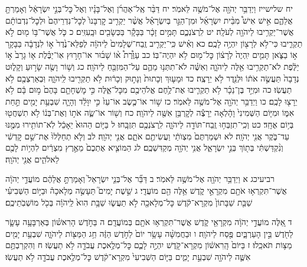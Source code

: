 \documentclass[twoside, openany, parskip=half, 11pt]{book}
\begin{document}
יח שלישייז וַיְדַבֵּ֥ר יְהֹוָ֖ה אֶל־מֹשֶׁ֥ה לֵּאמֹֽר׃ יח דַּבֵּ֨ר אֶֽל־אַהֲרֹ֜ן וְאֶל־בָּנָ֗יו וְאֶל֙ כׇּל־בְּנֵ֣י יִשְׂרָאֵ֔ל וְאָמַרְתָּ֖ אֲלֵהֶ֑ם אִ֣ישׁ אִישׁ֩ מִבֵּ֨ית יִשְׂרָאֵ֜ל וּמִן־הַגֵּ֣ר בְּיִשְׂרָאֵ֗ל אֲשֶׁ֨ר יַקְרִ֤יב קׇרְבָּנוֹ֙ לְכׇל־נִדְרֵיהֶם֙ וּלְכׇל־נִדְבוֹתָ֔ם אֲשֶׁר־יַקְרִ֥יבוּ לַיהֹוָ֖ה לְעֹלָֽה׃ יט לִֽרְצֹנְכֶ֑ם תָּמִ֣ים זָכָ֔ר בַּבָּקָ֕ר בַּכְּשָׂבִ֖ים וּבָֽעִזִּֽים׃ כ כֹּ֛ל אֲשֶׁר־בּ֥וֹ מ֖וּם לֹ֣א תַקְרִ֑יבוּ כִּי־לֹ֥א לְרָצ֖וֹן יִהְיֶ֥ה לָכֶֽם׃ כא וְאִ֗ישׁ כִּֽי־יַקְרִ֤יב זֶֽבַח־שְׁלָמִים֙ לַיהֹוָ֔ה לְפַלֵּא־נֶ֙דֶר֙ א֣וֹ לִנְדָבָ֔ה בַּבָּקָ֖ר א֣וֹ בַצֹּ֑אן תָּמִ֤ים יִֽהְיֶה֙ לְרָצ֔וֹן כׇּל־מ֖וּם לֹ֥א יִהְיֶה־בּֽוֹ׃ כב עַוֶּ֩רֶת֩ א֨וֹ שָׁב֜וּר אוֹ־חָר֣וּץ אֽוֹ־יַבֶּ֗לֶת א֤וֹ גָרָב֙ א֣וֹ יַלֶּ֔פֶת לֹא־תַקְרִ֥יבוּ אֵ֖לֶּה לַיהֹוָ֑ה וְאִשֶּׁ֗ה לֹא־תִתְּנ֥וּ מֵהֶ֛ם עַל־הַמִּזְבֵּ֖חַ לַיהֹוָֽה׃ כג וְשׁ֥וֹר וָשֶׂ֖ה שָׂר֣וּעַ וְקָל֑וּט נְדָבָה֙ תַּעֲשֶׂ֣ה אֹת֔וֹ וּלְנֵ֖דֶר לֹ֥א יֵרָצֶֽה׃ כד וּמָע֤וּךְ וְכָתוּת֙ וְנָת֣וּק וְכָר֔וּת לֹ֥א תַקְרִ֖יבוּ לַֽיהֹוָ֑ה וּֽבְאַרְצְכֶ֖ם לֹ֥א תַעֲשֽׂוּ׃ כה וּמִיַּ֣ד בֶּן־נֵכָ֗ר לֹ֥א תַקְרִ֛יבוּ אֶת־לֶ֥חֶם אֱלֹהֵיכֶ֖ם מִכׇּל־אֵ֑לֶּה כִּ֣י מׇשְׁחָתָ֤ם בָּהֶם֙ מ֣וּם בָּ֔ם לֹ֥א יֵרָצ֖וּ לָכֶֽם׃
כו וַיְדַבֵּ֥ר יְהֹוָ֖ה אֶל־מֹשֶׁ֥ה לֵּאמֹֽר׃ כז שׁ֣וֹר אוֹ־כֶ֤שֶׂב אוֹ־עֵז֙ כִּ֣י יִוָּלֵ֔ד וְהָיָ֛ה שִׁבְעַ֥ת יָמִ֖ים תַּ֣חַת אִמּ֑וֹ וּמִיּ֤וֹם הַשְּׁמִינִי֙ וָהָ֔לְאָה יֵרָצֶ֕ה לְקׇרְבַּ֥ן אִשֶּׁ֖ה לַיהֹוָֽה׃ כח וְשׁ֖וֹר אוֹ־שֶׂ֑ה אֹת֣וֹ וְאֶת־בְּנ֔וֹ לֹ֥א תִשְׁחֲט֖וּ בְּי֥וֹם אֶחָֽד׃ כט וְכִֽי־תִזְבְּח֥וּ זֶֽבַח־תּוֹדָ֖ה לַיהֹוָ֑ה לִֽרְצֹנְכֶ֖ם תִּזְבָּֽחוּ׃ ל בַּיּ֤וֹם הַהוּא֙ יֵאָכֵ֔ל לֹֽא־תוֹתִ֥ירוּ מִמֶּ֖נּוּ עַד־בֹּ֑קֶר אֲנִ֖י יְהֹוָֽה׃ לא וּשְׁמַרְתֶּם֙ מִצְוֺתַ֔י וַעֲשִׂיתֶ֖ם אֹתָ֑ם אֲנִ֖י יְהֹוָֽה׃ לב וְלֹ֤א תְחַלְּלוּ֙ אֶת־שֵׁ֣ם קׇדְשִׁ֔י וְנִ֨קְדַּשְׁתִּ֔י בְּת֖וֹךְ בְּנֵ֣י יִשְׂרָאֵ֑ל אֲנִ֥י יְהֹוָ֖ה מְקַדִּשְׁכֶֽם׃ לג הַמּוֹצִ֤יא אֶתְכֶם֙ מֵאֶ֣רֶץ מִצְרַ֔יִם לִהְי֥וֹת לָכֶ֖ם לֵאלֹהִ֑ים אֲנִ֖י יְהֹוָֽה׃

רביעיכג א וַיְדַבֵּ֥ר יְהֹוָ֖ה אֶל־מֹשֶׁ֥ה לֵּאמֹֽר׃ ב דַּבֵּ֞ר אֶל־בְּנֵ֤י יִשְׂרָאֵל֙ וְאָמַרְתָּ֣ אֲלֵהֶ֔ם מוֹעֲדֵ֣י יְהֹוָ֔ה אֲשֶׁר־תִּקְרְא֥וּ אֹתָ֖ם מִקְרָאֵ֣י קֹ֑דֶשׁ אֵ֥לֶּה הֵ֖ם מוֹעֲדָֽי׃ ג שֵׁ֣שֶׁת יָמִים֮ תֵּעָשֶׂ֣ה מְלָאכָה֒ וּבַיּ֣וֹם הַשְּׁבִיעִ֗י שַׁבַּ֤ת שַׁבָּתוֹן֙ מִקְרָא־קֹ֔דֶשׁ כׇּל־מְלָאכָ֖ה לֹ֣א תַעֲשׂ֑וּ שַׁבָּ֥ת הִוא֙ לַֽיהֹוָ֔ה בְּכֹ֖ל מוֹשְׁבֹֽתֵיכֶֽם׃

ד אֵ֚לֶּה מוֹעֲדֵ֣י יְהֹוָ֔ה מִקְרָאֵ֖י קֹ֑דֶשׁ אֲשֶׁר־תִּקְרְא֥וּ אֹתָ֖ם בְּמוֹעֲדָֽם׃ ה בַּחֹ֣דֶשׁ הָרִאשׁ֗וֹן בְּאַרְבָּעָ֥ה עָשָׂ֛ר לַחֹ֖דֶשׁ בֵּ֣ין הָעַרְבָּ֑יִם פֶּ֖סַח לַיהֹוָֽה׃ ו וּבַחֲמִשָּׁ֨ה עָשָׂ֥ר יוֹם֙ לַחֹ֣דֶשׁ הַזֶּ֔ה חַ֥ג הַמַּצּ֖וֹת לַיהֹוָ֑ה שִׁבְעַ֥ת יָמִ֖ים מַצּ֥וֹת תֹּאכֵֽלוּ׃ ז בַּיּוֹם֙ הָֽרִאשׁ֔וֹן מִקְרָא־קֹ֖דֶשׁ יִהְיֶ֣ה לָכֶ֑ם כׇּל־מְלֶ֥אכֶת עֲבֹדָ֖ה לֹ֥א תַעֲשֽׂוּ׃ ח וְהִקְרַבְתֶּ֥ם אִשֶּׁ֛ה לַיהֹוָ֖ה שִׁבְעַ֣ת יָמִ֑ים בַּיּ֤וֹם הַשְּׁבִיעִי֙ מִקְרָא־קֹ֔דֶשׁ כׇּל־מְלֶ֥אכֶת עֲבֹדָ֖ה לֹ֥א תַעֲשֽׂוּ׃
\end{document}
